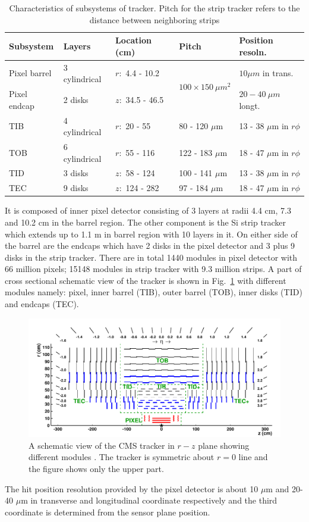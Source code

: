 \begin{table}[h!]
\centering
\caption[Characteristics of tracker]{Characteristics of subsystems of tracker. Pitch for the strip tracker refers to the distance between neighboring strips}
\label{tab:tracker}
\begin{tabular}{lllll}
\hline
Subsystem	&	Layers	&	Location (cm)	&	Pitch	&		Position resoln.\\\hline
Pixel barrel&	3 cylindrical	&	$r:$ 4.4 - 10.2 &	\multirow{2}{*}{$100\times150\ \mu m^2$}	&	$10\mu m$ in trans.\\
Pixel endcap&	2 disks	&		$z:$ 34.5 - 46.5	&		&	 $20-40\ \mu m$ longt.\\\hline
TIB			&	4 cylindrical & $r:$ 20 - 55 &	80 - 120 $\mu$m &	13 - 38 $\mu$m in $r\phi$\\\hline
TOB			&	6 cylindrical &	$r:$ 55 - 116&	122 - 183 $\mu$m &	18 - 47 $\mu$m in $r\phi$\\\hline
TID			&	3 disks		  &	$z:$ 58 - 124&	100 - 141 $\mu$m &	13 - 38 $\mu$m in $r\phi$\\\hline
TEC			&	9 disks		  &	$z:$ 124 - 282&	97 - 184 $\mu$m &	18 - 47 $\mu$m in $r\phi$\\\hline
\end{tabular}
\end{table}

It is composed of inner pixel detector consisting of 3 layers at radii 4.4 cm, 7.3 and 10.2 cm in the barrel region. The other component 
is the Si strip tracker which extends up to 1.1 m in barrel region with 10 layers in it. On either side of the barrel are the endcaps 
which have 2 disks in the pixel detector and 3 plus 9 disks in the strip tracker. There are in total 1440 modules in pixel detector with 
66 million pixels; 15148 modules in strip tracker with 9.3 million strips. A part of cross sectional schematic view of the tracker 
\cite{Collaboration_2014} is shown in Fig.~\ref{fig:Tracker} with different modules namely: pixel, inner barrel (TIB), outer barrel (TOB), 
inner disks (TID) and endcaps (TEC). 
\begin{figure}[h!]
\centering
\includegraphics[width=0.95\linewidth]{../Figures/Chap2/Tracker}
\caption[CMS tracker]{A schematic view of the CMS tracker in $r-z$ plane showing different modules \cite{Collaboration_2014}. The tracker is symmetric about $r=0$ line and the figure shows only the upper part.}
\label{fig:Tracker}
\end{figure}
The hit position resolution provided by the pixel detector is about 10 $\mu$m and 20-40 $\mu$m in transverse and longitudinal coordinate respectively and the third coordinate is determined from the sensor plane position.

